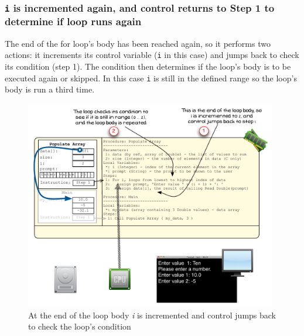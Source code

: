\clearpage
\subsubsection{\texttt{i} is incremented again, and control returns to Step 1 to determine if loop runs again} %
\label{ssub:i_is_incremented_again_and_control_returns_to_step_1_to_determine_if_loop_runs_again}

The end of the for loop's body has been reached again, so it performs two actions: it increments its control variable (\texttt{i} in this case) and jumps back to check its condition (step 1). The condition then determines if the loop's body is to be executed again or skipped. In this case \texttt{i} is still in the defined range so the loop's body is run a third time.

\begin{figure}[htbp]
   \centering
   \includegraphics[width=0.98\textwidth]{./topics/arrays/images/PopulateArray9} 
   \caption{At the end of the loop body \emph{i} is incremented and control jumps back to check the loop's condition}
   \label{fig:populate-array-vis-9}
\end{figure}



